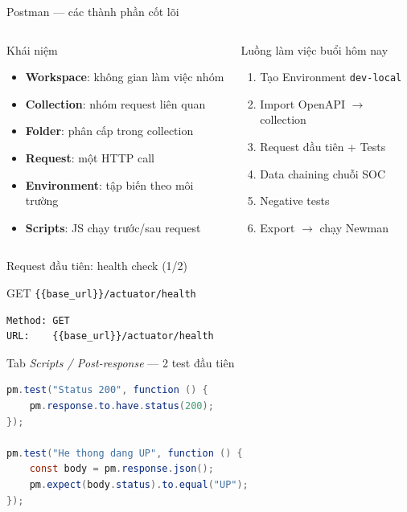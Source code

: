 \documentclass[aspectratio=169,12pt]{beamer}
\begin{document}
\begin{frame}{Postman --- các thành phần cốt lõi}
  \begin{columns}[T]
    \begin{block}{Khái niệm}
      \begin{itemize}
        \item \textbf{Workspace}: không gian làm việc nhóm
        \item \textbf{Collection}: nhóm request liên quan
        \item \textbf{Folder}: phân cấp trong collection
        \item \textbf{Request}: một HTTP call
        \item \textbf{Environment}: tập biến theo môi trường
        \item \textbf{Scripts}: JS chạy trước/sau request
      \end{itemize}
    \end{block}

    \begin{block}{Luồng làm việc buổi hôm nay}
      \begin{enumerate}
        \item Tạo Environment \texttt{dev-local}
        \item Import OpenAPI $\to$ collection
        \item Request đầu tiên + Tests
        \item Data chaining chuỗi SOC
        \item Negative tests
        \item Export $\to$ chạy Newman
      \end{enumerate}
    \end{block}
  \end{columns}
\end{frame}

\begin{frame}[fragile]{Request đầu tiên: health check (1/2)}
  \begin{block}{GET \texttt{\{\{base\_url\}\}/actuator/health}}
\begin{lstlisting}[language={}]
Method: GET
URL:    {{base_url}}/actuator/health
\end{lstlisting}
  \end{block}

  \begin{block}{Tab \emph{Scripts / Post-response} --- 2 test đầu tiên}
\begin{lstlisting}[language=Java]
pm.test("Status 200", function () {
    pm.response.to.have.status(200);
});

pm.test("He thong dang UP", function () {
    const body = pm.response.json();
    pm.expect(body.status).to.equal("UP");
});
\end{lstlisting}
  \end{block}
\end{frame}
\end{document}
